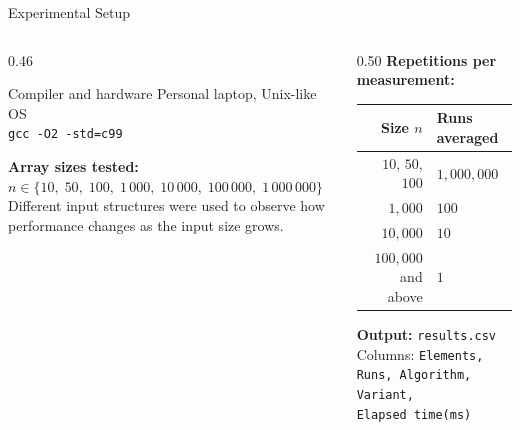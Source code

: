 \documentclass[aspectratio=169]{beamer}
\begin{document}
\begin{frame}{Experimental Setup}
  \begin{columns}[T]
    \begin{column}{0.46\textwidth}
      \begin{block}{Compiler and hardware}
        Personal laptop, Unix-like OS\\
        \texttt{gcc -O2 -std=c99}
      \end{block}
      \vspace{0.6em}
      \textbf{Array sizes tested:}\\[0.3em]
      {\footnotesize$n \in \{10,\;50,\;100,\;1\,000,\;10\,000,\;100\,000,\;1\,000\,000\}$}
      Different input structures were used to observe how performance
      changes as the input size grows.
    \end{column}
    \begin{column}{0.50\textwidth}
      \textbf{Repetitions per measurement:}
      \begin{table}
        \centering
        \small
        \begin{tabular}{rl}
          \toprule
          \textbf{Size $n$}    & \textbf{Runs averaged} \\
          \midrule
          $10$, $50$, $100$    & $1{,}000{,}000$ \\
          $1{,}000$            & $100$ \\
          $10{,}000$           & $10$ \\
          $100{,}000$ and above & $1$ \\
          \bottomrule
        \end{tabular}
      \end{table}
      \vspace{0.4em}
      \textbf{Output:} \texttt{results.csv}\\
      Columns: \texttt{Elements, Runs, Algorithm, Variant, Elapsed~time(ms)}
    \end{column}
  \end{columns}
\end{frame}
\end{document}
